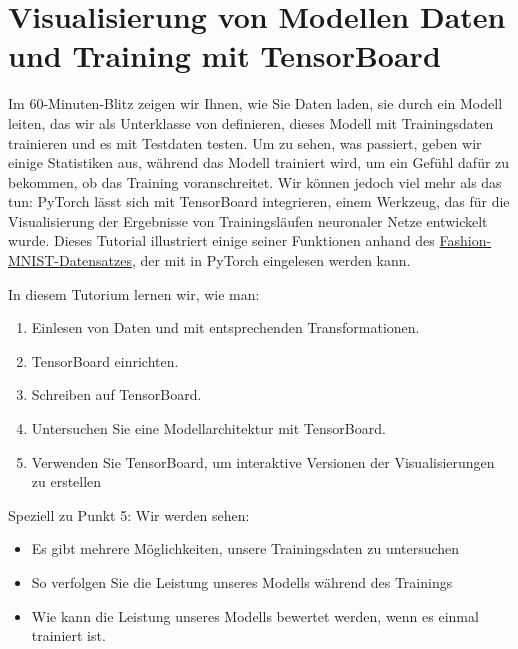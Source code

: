 %
%


\chapter{Visualisierung von Modellen Daten und Training mit TensorBoard}

Im 60-Minuten-Blitz zeigen wir Ihnen, wie Sie Daten laden, sie durch ein Modell leiten, das wir als Unterklasse von  definieren, dieses Modell mit Trainingsdaten trainieren und es mit Testdaten testen. Um zu sehen, was passiert, geben wir einige Statistiken aus, während das Modell trainiert wird, um ein Gefühl dafür zu bekommen, ob das Training voranschreitet. Wir können jedoch viel mehr als das tun: PyTorch lässt sich mit TensorBoard integrieren, einem Werkzeug, das für die Visualisierung der Ergebnisse von Trainingsläufen neuronaler Netze entwickelt wurde. Dieses Tutorial illustriert einige seiner Funktionen anhand des \href{../../Python/fashion-mnist}{Fashion-MNIST-Datensatzes}, der mit  in PyTorch eingelesen werden kann.

\bigskip

In diesem Tutorium lernen wir, wie man:

\begin{enumerate}
  \item Einlesen von Daten und mit entsprechenden Transformationen.
  \item TensorBoard einrichten.
  \item Schreiben auf TensorBoard.
  \item Untersuchen Sie eine Modellarchitektur mit TensorBoard.
  \item Verwenden Sie TensorBoard, um interaktive Versionen der Visualisierungen zu erstellen
\end{enumerate}

\bigskip
  
Speziell zu Punkt 5: Wir werden sehen:

\begin{itemize}
    \item Es gibt mehrere Möglichkeiten, unsere Trainingsdaten zu untersuchen
    \item So verfolgen Sie die Leistung unseres Modells während des Trainings
    \item Wie kann die Leistung unseres Modells bewertet werden, wenn es einmal trainiert ist.
\end{itemize}

